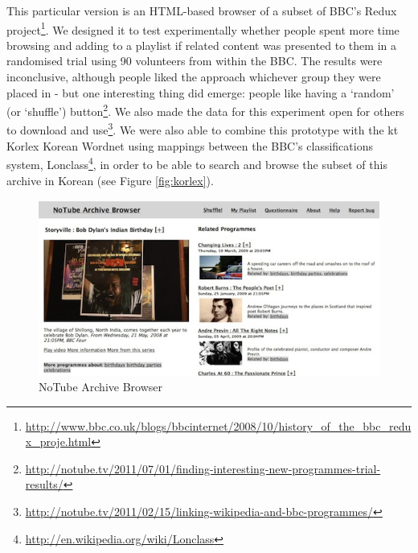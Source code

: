 \documentclass{notube}
\begin{document}
This particular version is an HTML-based browser of a subset of BBC's Redux project\footnote{\url{http://www.bbc.co.uk/blogs/bbcinternet/2008/10/history_of_the_bbc_redux_proje.html}}. We designed it to test experimentally whether people spent more time browsing and adding to a playlist if related content was presented to them in a randomised trial using 90 volunteers from within the BBC. The results were inconclusive, although people liked the approach whichever group they were placed in -  but one interesting thing did emerge: people like having a `random' (or `shuffle') button\footnote{\url{http://notube.tv/2011/07/01/finding-interesting-new-programmes-trial-results/}}. We also made the data for this experiment open for others to download and use\footnote{\url{http://notube.tv/2011/02/15/linking-wikipedia-and-bbc-programmes/}}. We were also able to combine this prototype with the kt Korlex Korean Wordnet using mappings between the BBC's classifications system, Lonclass\footnote{\url{http://en.wikipedia.org/wiki/Lonclass}}, in order to be able to search and browse the subset of this archive in Korean (see Figure \ref{fig:korlex}).

\begin{figure}[htbp]
\begin{center}
\includegraphics[width=6in]{images/notube-archive-browser.jpg}
\caption{NoTube Archive Browser} \label{fig:archive}
\end{center}
\end{figure} 
\end{document}
